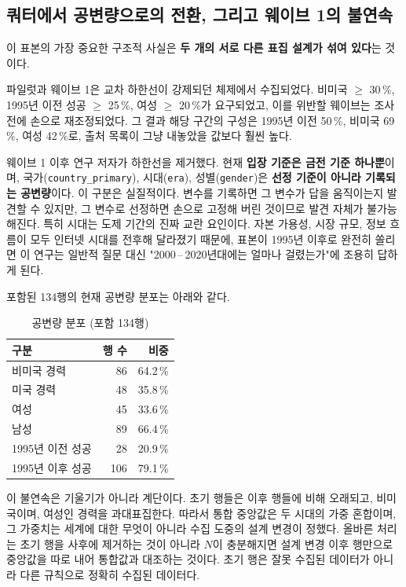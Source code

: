 \documentclass[11pt]{article}
\begin{document}
\subsection{쿼터에서 공변량으로의 전환, 그리고 웨이브 1의 불연속}

이 표본의 가장 중요한 구조적 사실은 \textbf{두 개의 서로 다른 표집 설계가 섞여 있다}는 것이다.

파일럿과 웨이브 1은 교차 하한선이 강제되던 체제에서 수집되었다.
비미국 $\geq$ 30\,\%, 1995년 이전 성공 $\geq$ 25\,\%, 여성 $\geq$ 20\,\%가 요구되었고,
이를 위반할 웨이브는 조사 전에 손으로 재조정되었다.
그 결과 해당 구간의 구성은 1995년 이전 50\,\%, 비미국 69\,\%, 여성 42\,\%로,
출처 목록이 그냥 내놓았을 값보다 훨씬 높다.

웨이브 1 이후 연구 저자가 하한선을 제거했다.
현재 \textbf{입장 기준은 금전 기준 하나뿐}이며,
국가(\texttt{country\_primary}), 시대(\texttt{era}), 성별(\texttt{gender})은
\textbf{선정 기준이 아니라 기록되는 공변량}이다.
이 구분은 실질적이다. 변수를 기록하면 그 변수가 답을 움직이는지 발견할 수 있지만,
그 변수로 선정하면 손으로 고정해 버린 것이므로 발견 자체가 불가능해진다.
특히 시대는 도제 기간의 진짜 교란 요인이다.
자본 가용성, 시장 규모, 정보 흐름이 모두 인터넷 시대를 전후해 달라졌기 때문에,
표본이 1995년 이후로 완전히 쏠리면 이 연구는 일반적 질문 대신
"2000\,--\,2020년대에는 얼마나 걸렸는가"에 조용히 답하게 된다.

포함된 134행의 현재 공변량 분포는 아래와 같다.

\begin{table}[h]
\centering
\caption{공변량 분포 (포함 134행)}
\begin{tabular}{L R R}
\toprule
구분 & 행 수 & 비중 \\
\midrule
비미국 경력 & 86 & 64.2\,\% \\
미국 경력   & 48 & 35.8\,\% \\
여성        & 45 & 33.6\,\% \\
남성        & 89 & 66.4\,\% \\
1995년 이전 성공 & 28 & 20.9\,\% \\
1995년 이후 성공 & 106 & 79.1\,\% \\
\bottomrule
\end{tabular}
\end{table}

이 불연속은 기울기가 아니라 계단이다.
초기 행들은 이후 행들에 비해 오래되고, 비미국이며, 여성인 경력을 과대표집한다.
따라서 통합 중앙값은 두 시대의 가중 혼합이며,
그 가중치는 세계에 대한 무엇이 아니라 수집 도중의 설계 변경이 정했다.
올바른 처리는 초기 행을 사후에 제거하는 것이 아니라
$N$이 충분해지면 설계 변경 이후 행만으로 중앙값을 따로 내어 통합값과 대조하는 것이다.
초기 행은 잘못 수집된 데이터가 아니라 다른 규칙으로 정확히 수집된 데이터다.
\end{document}
